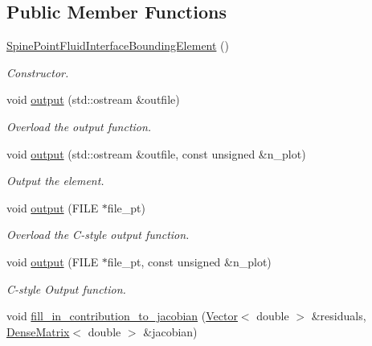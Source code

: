 \subsection*{Public Member Functions}
\begin{DoxyCompactItemize}
\item 
\hyperlink{classoomph_1_1SpinePointFluidInterfaceBoundingElement_a4cda221f4ee0528cc89076809f54c64e}{Spine\+Point\+Fluid\+Interface\+Bounding\+Element} ()
\begin{DoxyCompactList}\small\item\em Constructor. \end{DoxyCompactList}\item 
void \hyperlink{classoomph_1_1SpinePointFluidInterfaceBoundingElement_ac35833173407cde9359c8163a0eba35c}{output} (std\+::ostream \&outfile)
\begin{DoxyCompactList}\small\item\em Overload the output function. \end{DoxyCompactList}\item 
void \hyperlink{classoomph_1_1SpinePointFluidInterfaceBoundingElement_a05a5383f07c840e07d8c2279cce80aaa}{output} (std\+::ostream \&outfile, const unsigned \&n\+\_\+plot)
\begin{DoxyCompactList}\small\item\em Output the element. \end{DoxyCompactList}\item 
void \hyperlink{classoomph_1_1SpinePointFluidInterfaceBoundingElement_a2435b4b786ede183808834b4d0c5210c}{output} (F\+I\+LE $\ast$file\+\_\+pt)
\begin{DoxyCompactList}\small\item\em Overload the C-\/style output function. \end{DoxyCompactList}\item 
void \hyperlink{classoomph_1_1SpinePointFluidInterfaceBoundingElement_a75a530620bfa2a983fec2e1c7f801db2}{output} (F\+I\+LE $\ast$file\+\_\+pt, const unsigned \&n\+\_\+plot)
\begin{DoxyCompactList}\small\item\em C-\/style Output function. \end{DoxyCompactList}\item 
void \hyperlink{classoomph_1_1SpinePointFluidInterfaceBoundingElement_afe714a2a2b9f741558376cc144e19232}{fill\+\_\+in\+\_\+contribution\+\_\+to\+\_\+jacobian} (\hyperlink{classoomph_1_1Vector}{Vector}$<$ double $>$ \&residuals, \hyperlink{classoomph_1_1DenseMatrix}{Dense\+Matrix}$<$ double $>$ \&jacobian)

\end{DoxyCompactItemize}
